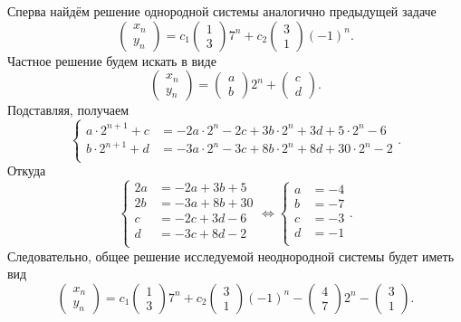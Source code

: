\documentclass[a4paper]{article}
\begin{document}
\begin{sol}
Сперва найдём решение однородной системы аналогично
предыдущей задаче
\[
\begin{pmatrix} x_n \\y_n \end{pmatrix} =
c_1\begin{pmatrix}1\\3  \end{pmatrix} 7^n+ c_2
\begin{pmatrix} 3\\1 \end{pmatrix} (-1)^n
.\] 
Частное решение будем искать в виде
\[
\begin{pmatrix} x_n \\ y_n \end{pmatrix} = \begin{pmatrix} a\\b \end{pmatrix} 2^n+ \begin{pmatrix} c \\d \end{pmatrix} 
.\] 
Подставляя, получаем
\[
\left\{
\begin{aligned}
	a \cdot2^{n+1}+c&=-2a\cdot 2^{n}-2c+3b\cdot 2^n+3d+
	5\cdot 2^n-6\\
	b\cdot 2^{n+1}+d &= -3a\cdot 2^n-3c+8b\cdot 2^n+8d+
	30\cdot 2^n-2\\
\end{aligned}
\right.
.\] 
Откуда
\[
\left\{
\begin{aligned}
2a&= -2a+3b+5 \\
2b&= -3a+8b+30 \\
c&= -2c+3d-6 \\
d&= -3c+8d-2 \\
\end{aligned}
\right. 
\Leftrightarrow 
\left\{
\begin{aligned}
a&= -4 \\
b&= -7 \\
c&= -3 \\
d&= -1 \\
\end{aligned}
\right.
.\] 
Следовательно, общее решение исследуемой
неоднородной системы будет иметь вид
\[
\begin{pmatrix} x_n\\y_n \end{pmatrix} =
c_1 \begin{pmatrix} 1\\3 \end{pmatrix} 7^n+c_2
\begin{pmatrix} 3\\1 \end{pmatrix} (-1)^n-
\begin{pmatrix} 4\\7 \end{pmatrix} 2^n-\begin{pmatrix} 3\\1 \end{pmatrix} 
.\] 
\end{sol}
\end{document}
